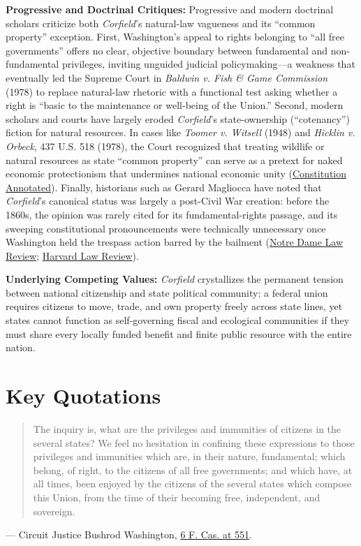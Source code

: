 \documentclass[12pt]{article}
\begin{document}
\textbf{Progressive and Doctrinal Critiques:} Progressive and modern doctrinal scholars criticize both \textit{Corfield}'s natural-law vagueness and its ``common property'' exception. First, Washington's appeal to rights belonging to ``all free governments'' offers no clear, objective boundary between fundamental and non-fundamental privileges, inviting unguided judicial policymaking---a weakness that eventually led the Supreme Court in \textit{Baldwin v. Fish \& Game Commission} (1978) to replace natural-law rhetoric with a functional test asking whether a right is ``basic to the maintenance or well-being of the Union.'' Second, modern scholars and courts have largely eroded \textit{Corfield}'s state-ownership (``cotenancy'') fiction for natural resources. In cases like \textit{Toomer v. Witsell} (1948) and \textit{Hicklin v. Orbeck}, 437 U.S. 518 (1978), the Court recognized that treating wildlife or natural resources as state ``common property'' can serve as a pretext for naked economic protectionism that undermines national economic unity (\href{https://constitution.congress.gov/browse/essay/artIV-S2-C1-7/ALDE_00013783/}{Constitution Annotated}). Finally, historians such as Gerard Magliocca have noted that \textit{Corfield}'s canonical status was largely a post-Civil War creation: before the 1860s, the opinion was rarely cited for its fundamental-rights passage, and its sweeping constitutional pronouncements were technically unnecessary once Washington held the trespass action barred by the bailment (\href{https://scholarship.law.nd.edu/cgi/viewcontent.cgi?article=4885&context=ndlr}{Notre Dame Law Review}; \href{https://harvardlawreview.org/print/vol-128/congresss-power-to-define-the-privileges-and-immunities-of-citizenship/}{Harvard Law Review}).

\textbf{Underlying Competing Values:} \textit{Corfield} crystallizes the permanent tension between national citizenship and state political community: a federal union requires citizens to move, trade, and own property freely across state lines, yet states cannot function as self-governing fiscal and ecological communities if they must share every locally funded benefit and finite public resource with the entire nation.

\section{Key Quotations}

\begin{quote}
The inquiry is, what are the privileges and immunities of citizens in the several states? We feel no hesitation in confining these expressions to those privileges and immunities which are, in their nature, fundamental; which belong, of right, to the citizens of all free governments; and which have, at all times, been enjoyed by the citizens of the several states which compose this Union, from the time of their becoming free, independent, and sovereign.
\end{quote}
\noindent --- Circuit Justice Bushrod Washington, \href{https://press-pubs.uchicago.edu/founders/documents/a4_2_1s18.html}{6 F. Cas. at 551}.
\end{document}
